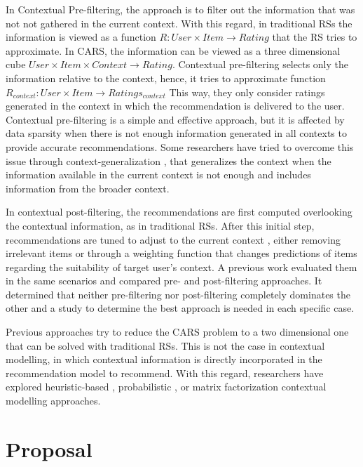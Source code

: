 \documentclass[preprint]{elsarticle}
\begin{document}
\begin{spacing}{2}
In Contextual Pre-filtering, the approach is to filter out the information that was not not gathered in the current context. With this regard, in traditional RSs the information is viewed as a function $R: User \times Item \rightarrow Rating $ that the RS tries to approximate. In CARS, the information can be viewed as a three dimensional cube $User \times Item \times Context \rightarrow Rating$. Contextual pre-filtering selects only the information relative to the context, hence, it tries to approximate function $R_{context}: User \times Item \rightarrow Ratings_{context}$ This way, they only consider ratings generated in the context in which the recommendation is delivered to the user. Contextual pre-filtering is a simple and effective approach, but it is affected by data sparsity when there is not enough information generated in all contexts to provide accurate recommendations. Some researchers have tried to overcome this issue through context-generalization \cite{Adomavicius2011}, that generalizes the context when the information available in the current context is not enough and includes information from the broader context.

In contextual post-filtering, the recommendations are first computed overlooking the contextual information, as in traditional RSs. After this initial step, recommendations are tuned to adjust to the current context \cite{Panniello2009}, either removing irrelevant items or through a weighting function that changes predictions of items regarding the suitability of target user's context. A previous work \cite{} evaluated them in the same scenarios and compared pre- and post-filtering approaches. It determined that neither pre-filtering nor post-filtering completely dominates the other and a study to determine the best approach is needed in each specific case.

Previous approaches try to reduce the CARS problem to a two dimensional one that can be solved with traditional RSs. This is not the case in contextual modelling, in which contextual information is directly incorporated in the recommendation model to recommend. With this regard, researchers have explored heuristic-based \cite{Panniello2014}, probabilistic \cite{Adomavicius2005b}, or matrix factorization \cite{Baltrunas2011c} contextual modelling approaches.



\section{Proposal}


\end{spacing}
\end{document}
